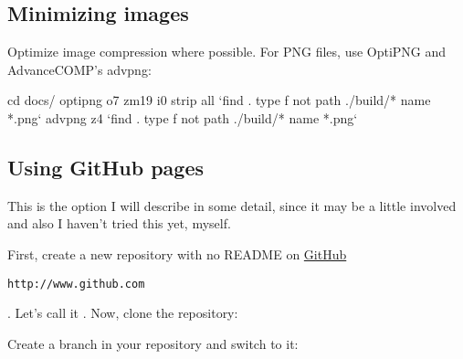 \documentclass[a4paper,10pt,french]{sphinxmanual}
\begin{document}
\subsection{Minimizing images}
\label{\detokenize{docs/tuts/autocad-tut01:id2}}
Optimize image compression where possible. For PNG files, use OptiPNG and AdvanceCOMP’s advpng:

\begin{sphinxVerbatim}[commandchars=\\\{\}]
\PYGZdl{} cd docs/
\PYGZdl{} optipng \PYGZhy{}o7 \PYGZhy{}zm1\PYGZhy{}9 \PYGZhy{}i0 \PYGZhy{}strip all {}`find . \PYGZhy{}type f \PYGZhy{}not \PYGZhy{}path \PYGZdq{}./\PYGZus{}build/*\PYGZdq{} \PYGZhy{}name \PYGZdq{}*.png\PYGZdq{}{}`
\PYGZdl{} advpng \PYGZhy{}z4 {}`find . \PYGZhy{}type f \PYGZhy{}not \PYGZhy{}path \PYGZdq{}./\PYGZus{}build/*\PYGZdq{} \PYGZhy{}name \PYGZdq{}*.png\PYGZdq{}{}`
\end{sphinxVerbatim}


\subsection{Using GitHub pages}
\label{\detokenize{docs/tuts/autocad-tut01:using-github-pages}}
This is the option I will describe in some detail, since it may be a
little involved and also I haven't tried this yet, myself.

First, create a new  repository with no README on \href{http://www.github.com}{GitHub}%
\begin{footnote}[5]\sphinxAtStartFootnote
\nolinkurl{http://www.github.com}
%
\end{footnote}. Let's call it . Now, clone the
repository:

\begin{sphinxVerbatim}[commandchars=\\\{\}]
  
          
                
\end{sphinxVerbatim}

Create a  branch in your repository and switch to it:
\end{document}
